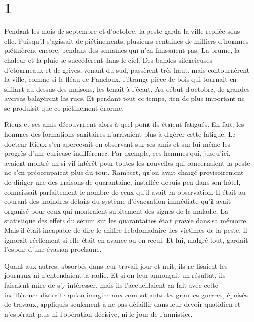 \documentclass[french,twoside]{book} %
\newcommand\chaptercont{} %
\begin{document}
\chaptercont
\section[{1}]{1}
\noindent Pendant les mois de septembre et d’octobre, la peste garda la ville repliée sous elle. Puisqu’il s’agissait de piétinements, plusieurs centaines de milliers d’hommes piétinèrent encore, pendant des semaines qui n’en finissaient pas. La brume, la chaleur et la pluie se succédèrent dans le ciel. Des bandes silencieuses d’étourneaux et de grives, venant du sud, passèrent très haut, mais contournèrent la ville, comme si le fléau de Paneloux, l’étrange pièce de bois qui tournait en sifflant au-dessus des maisons, les tenait à l’écart. Au début d’octobre, de grandes averses balayèrent les rues. Et pendant tout ce temps, rien de plus important ne se produisit que ce piétinement énorme.\par
Rieux et ses amis découvrirent alors à quel point ils étaient fatigués. En fait, les hommes des formations sanitaires n’arrivaient plus à digérer cette fatigue. Le docteur Rieux s’en apercevait en observant sur ses amis et sur lui-même les progrès d’une curieuse indifférence. Par exemple, ces hommes qui, jusqu’ici, avaient montré un si vif intérêt pour toutes les nouvelles qui concernaient la peste ne s’en préoccupaient plus du tout. Rambert, qu’on avait chargé provisoirement de diriger une des maisons de quarantaine, installée depuis peu dans son hôtel, connaissait parfaitement le nombre de ceux qu’il avait en observation. Il était au courant des moindres détails du système d’évacuation immédiate qu’il avait organisé pour ceux qui montraient subitement des signes de la maladie. La statistique des effets du sérum sur les quarantaines était gravée dans sa mémoire. Mais il était incapable de dire le chiffre hebdomadaire des victimes de la peste, il ignorait réellement si elle était en avance ou en recul. Et lui, malgré tout, gardait l’espoir d’une évasion prochaine.\par
Quant aux autres, absorbés dans leur travail jour et nuit, ils ne lisaient les journaux ni n’entendaient la radio. Et si on leur annonçait un résultat, ils faisaient mine de s’y intéresser, mais ils l’accueillaient en fait avec cette indifférence distraite qu’on imagine aux combattants des grandes guerres, épuisés de travaux, appliqués seulement à ne pas défaillir dans leur devoir quotidien et n’espérant plus ni l’opération décisive, ni le jour de l’armistice.\par
\end{document}
